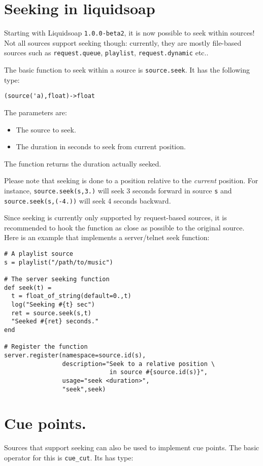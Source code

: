 \section{Seeking in liquidsoap}
Starting with Liquidsoap \verb+1.0.0-beta2+, it is now possible to seek within sources! 
Not all sources support seeking though: currently, they are mostly file-based sources
such as \verb+request.queue+, \verb+playlist+, \verb+request.dynamic+ etc..

The basic function to seek within a source is \verb+source.seek+. It has the following type:

\begin{verbatim}
(source('a),float)->float
\end{verbatim}
The parameters are:

\begin{itemize}
\item The source to seek.
\item The duration in seconds to seek from current position.

\end{itemize}
The function returns the duration actually seeked.

Please note that seeking is done to a position relative to the \emph{current}
position. For instance, \verb+source.seek(s,3.)+ will seek 3 seconds forward in
source \verb+s+ and \verb+source.seek(s,(-4.))+ will seek 4 seconds backward.

Since seeking is currently only supported by request-based sources, it is recommended
to hook the function as close as possible to the original source. Here is an example
that implements a server/telnet seek function:

\begin{verbatim}
# A playlist source
s = playlist("/path/to/music")

# The server seeking function
def seek(t) =
  t = float_of_string(default=0.,t)
  log("Seeking #{t} sec")
  ret = source.seek(s,t)
  "Seeked #{ret} seconds."
end

# Register the function
server.register(namespace=source.id(s),
                description="Seek to a relative position \
                             in source #{source.id(s)}",
                usage="seek <duration>",
                "seek",seek)
\end{verbatim}
\section{Cue points.}
Sources that support seeking can also be used to implement cue points.
The basic operator for this is \verb+cue_cut+. Its has type:

